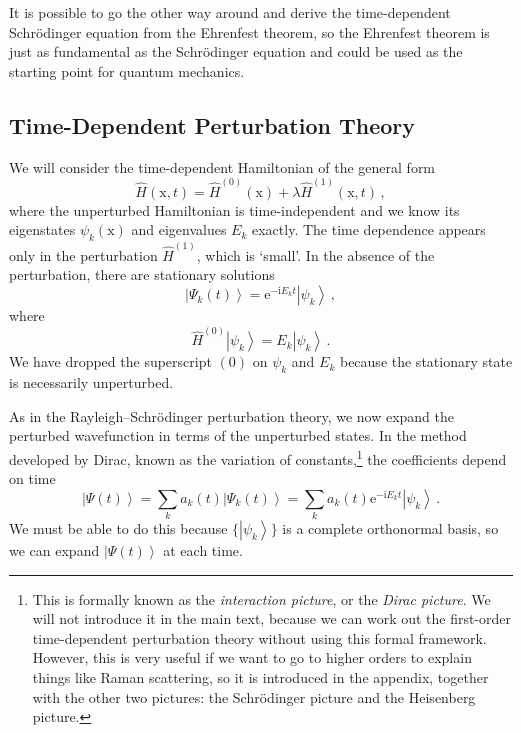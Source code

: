 \documentclass{article}
\theoremstyle{plain}\theoremheaderfont{\normalfont\itshape}\theorembodyfont{\rmfamily}\theoremseparator{.}\newtheorem*{rem}{Remark}\newtheorem*{ex}{Example}\newtheorem*{proof}{Proof}\newtheorem*{altp}{Alternative proof}
\theoremstyle{plain}\theoremheaderfont{\normalfont\bfseries}\theorembodyfont{\rmfamily}\theoremseparator{.}\newtheorem{thm}{Theorem}[section]\newtheorem{lem}[thm]{Lemma}\newtheorem{prop}[thm]{Proposition}\newtheorem*{cor}{Corollary}\newtheorem{defn}[thm]{Definition}\newtheorem{clm}[thm]{Claim}\newtheorem{clminproof}{Claim}
\theoremstyle{break}\theoremheaderfont{\normalfont\itshape}\theorembodyfont{\rmfamily}\theoremseparator{.\medskip}\newtheorem*{proofskip}{Proof}\newtheorem*{exs}{Examples}\newtheorem*{rems}{Remarks}
\theoremstyle{break}\theoremheaderfont{\normalfont\bfseries}\theorembodyfont{\rmfamily}\theoremseparator{.\medskip}\newtheorem{lemskip}[thm]{Lemma}\newtheorem{defnskip}[thm]{Definition}\newtheorem{propskip}[thm]{Proposition}\newtheorem{thmskip}[thm]{Theorem}
\numberwithin{equation}{section}
\newcommand{\ii}{\mathrm{i}}
\newcommand{\ee}{\mathrm{e}}
\newcommand{\ket}[1]{\left| #1 \right\rangle}
\newcommand{\vb}[1]{\bm{\mathrm{#1}}}
\begin{document}
    It is possible to go the other way around and derive the time-dependent Schr\"{o}dinger equation from the Ehrenfest theorem, so the Ehrenfest theorem is just as fundamental as the Schr\"{o}dinger equation and could be used as the starting point for quantum mechanics.

    \subsection{Time-Dependent Perturbation Theory}
    We will consider the time-dependent Hamiltonian of the general form
    \begin{equation}
        \hat{H}(\vb{x},t)=\hat{H}^{(0)}(\vb{x})+\lambda\hat{H}^{(1)}(\vb{x},t)\,,
    \end{equation}
    where the unperturbed Hamiltonian is time-independent and we know its eigenstates \(\psi_k(\vb{x})\) and eigenvalues \(E_k\) exactly. The time dependence appears only in the perturbation \(\hat{H}^{(1)}\), which is `small'. In the absence of the perturbation, there are stationary solutions
    \begin{equation}
        \ket{\Psi_k(t)}=\ee^{-\ii E_k t}\ket{\psi_k}\,,
    \end{equation}
    where
    \begin{equation}
        \hat{H}^{(0)}\ket{\psi_k}=E_k\ket{\psi_k}\,.
    \end{equation}
    We have dropped the superscript \((0)\) on \(\psi_k\) and \(E_k\) because the stationary state is necessarily unperturbed.

    As in the Rayleigh--Schr\"{o}dinger perturbation theory, we now expand the perturbed wavefunction in terms of the unperturbed states. In the method developed by Dirac, known as the variation of constants,\footnote{This is formally known as the \textit{interaction picture}, or the \textit{Dirac picture}. We will not introduce it in the main text, because we can work out the first-order time-dependent perturbation theory without using this formal framework. However, this is very useful if we want to go to higher orders to explain things like Raman scattering, so it is introduced in the appendix, together with the other two pictures: the Schr\"{o}dinger picture and the Heisenberg picture.} the coefficients depend on time
    \begin{equation}
        \ket{\Psi(t)}=\sum_k a_k(t)\ket{\Psi_k(t)}=\sum_k a_k(t) \ee^{-\ii E_k t} \ket{\psi_k}\,.
    \end{equation}
    We must be able to do this because \(\{\ket{\psi_k}\}\) is a complete orthonormal basis, so we can expand \(\ket{\Psi(t)}\) at each time.
\end{document}
